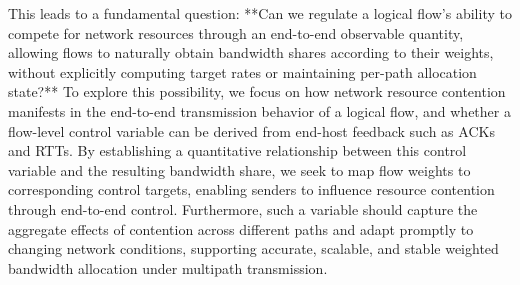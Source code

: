 This leads to a fundamental question: **Can we regulate a logical flow's ability to compete for network resources through an end-to-end observable quantity, allowing flows to naturally obtain bandwidth shares according to their weights, without explicitly computing target rates or maintaining per-path allocation state?** To explore this possibility, we focus on how network resource contention manifests in the end-to-end transmission behavior of a logical flow, and whether a flow-level control variable can be derived from end-host feedback such as ACKs and RTTs. By establishing a quantitative relationship between this control variable and the resulting bandwidth share, we seek to map flow weights to corresponding control targets, enabling senders to influence resource contention through end-to-end control. Furthermore, such a variable should capture the aggregate effects of contention across different paths and adapt promptly to changing network conditions, supporting accurate, scalable, and stable weighted bandwidth allocation under multipath transmission.



